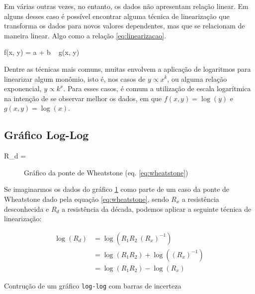 Em várias outras vezes, no entanto, os dados não apresentam relação linear. Em alguns desses caso é possível encontrar alguma técnica de linearização que transforma os dados para novos valores dependentes, mas que se relacionam de maneira linear. Algo como a relação \ref{eq:linearizacao}.

\begin{equacao} \label{eq:linearizacao}
    f(x, y) = a + b ~ g(x, y)
\end{equacao}

Dentre as técnicas mais comuns, muitas envolvem a aplicação de logaritmos para linearizar algum monômio, isto é, nos casos de $y \propto x^k$, ou alguma relação exponencial, $y \propto k^x$. Para esses casos, é comum a utilização de escala logarítmica na intenção de se observar melhor os dados, em que $f(x, y) = \log(y)$ e $g(x, y) = \log(x)$.


\subsection{Gráfico Log-Log} \label{sec:escala:loglog}

    \begin{equacao} \label{eq:wheatstone}
        R_d = 
    \end{equacao}

    \begin{figure}[H]
        \centering
        

        \caption{Gráfico da ponte de Wheatstone (eq. \ref{eq:wheatstone})}
        \label{fig:escala:loglog:dados}
    \end{figure}

    Se imaginarmos os dados do gráfico \ref{fig:escala:loglog:dados} como parte de um caso da ponte de Wheatstone dado pela equação \ref{eq:wheatstone}, sendo $R_x$ a resistência desconhecida e $R_d$ a resistência da década, podemos aplicar a seguinte técnica de linearização:

    \begin{align*}
        \log(R_d)
            &= \log\left(R_1 R_2 ~ (R_x)^{-1}\right) \\
            &= \log(R_1 R_2) + \log\left((R_x)^{-1}\right) \\
            &= \log(R_1 R_2) - \log(R_x)
    \end{align*}

    \begin{listing}[H]
        \caption{Contrução de um gráfico \texttt{log-log} com barras de incerteza}
        \label{code:escala:loglog}

    \end{listing}

